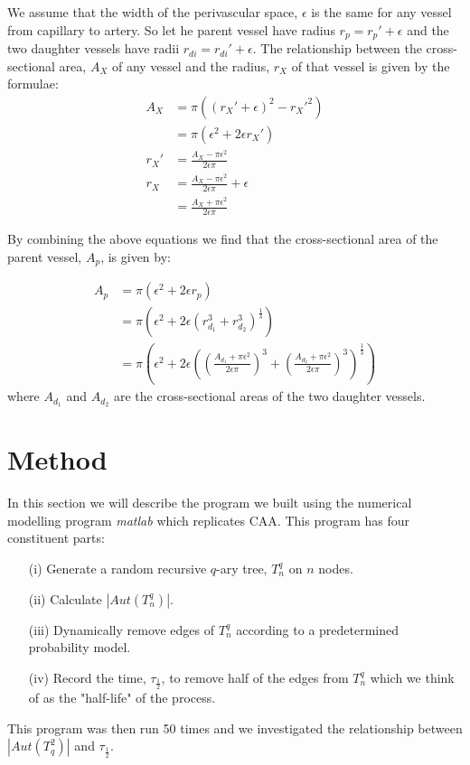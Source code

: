 \documentclass[12pt]{article} %
\theoremstyle{definition}
\begin{document}
We assume that the width of the perivascular space, $\epsilon$ is the same for any vessel from capillary to
 artery.  So let he parent vessel have radius $r_{p} = r_{p}' + \epsilon$ and the two 
daughter vessels have radii $r_{di} = r_{di}' + \epsilon$.
The relationship between the cross-sectional area, $A_{X}$ of any vessel and the radius, $r_{X}$ 
of that vessel is given by the formulae:
\begin{align*}
 A_{X} &= \pi((r_{X}' + \epsilon)^{2} - r_{X}'^{2})\\
 &= \pi(\epsilon^{2} + 2\epsilon r_{X}')\\
 r_{X}' &= \frac{A_{X} - \pi\epsilon^{2}}{2\epsilon\pi}\\
 r_{X} &=  \frac{A_{X} - \pi\epsilon^{2}}{2\epsilon\pi} + \epsilon \\
 &= \frac{A_{X} + \pi\epsilon^{2}}{2\epsilon\pi}
\end{align*}

By combining the above equations we find that the cross-sectional area of the parent
 vessel, $A_{p}$, is given by:

\begin{align*}
A_{p} &= \pi(\epsilon^{2} + 2\epsilon r_{p}) \\
&= \pi\left(\epsilon^{2} + 2\epsilon (r_{d_{1}}^{3} + r_{d_{2}}^{3})^{\frac{1}{3}}\right)\\
&= \pi\left(\epsilon^{2} + 2\epsilon \left(\left( \frac{A_{d_{1}} + \pi\epsilon^{2}}{2\epsilon\pi} \right)^{3} + \left( \frac{A_{d_{2}} + \pi\epsilon^{2}}{2\epsilon\pi} \right)^{3}\right)^{\frac{1}{3}}\right)
\end{align*}
where $A_{d_{1}}$ and $A_{d_{2}}$ are the cross-sectional areas of the two daughter vessels.



\section{Method}\label{sec:meth}

In this section we will describe the program we built using the numerical modelling program \emph{matlab} \cite{matlab} which replicates CAA.  This program has four constituent parts:
\begin{itemize}
\item[(i)]Generate a random recursive $q$-ary tree, $T^{q}_{n}$ on $n$ nodes.
\item[(ii)]Calculate $|Aut(T^{q}_{n})|$.
\item[(iii)]Dynamically remove edges of $T^{q}_{n}$ according to a predetermined probability model.
\item[(iv)]Record the time, $\tau_{\frac{1}{2}}$, to remove half of the edges from $T^{q}_{n}$ which we think of as the "half-life" of the process.
\end{itemize} 
This program was then run 50 times and we investigated the relationship between $|Aut(T_{q}^{2})|$ and $\tau_{\frac{1}{2}}$.   
\end{document}
